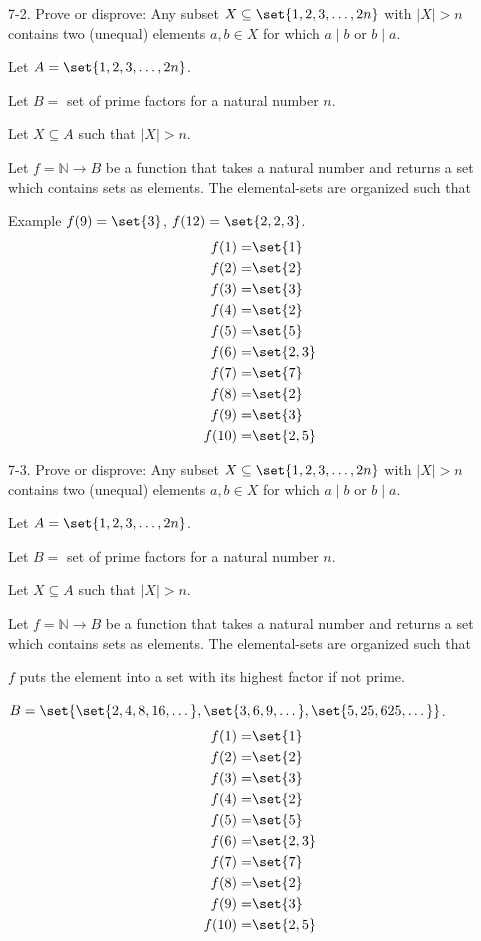 \documentclass{hippoidC}
\begin{document}
\begin{prooflist}{7-2. Prove or disprove: Any subset $X \subseteq\set{1,2,3, \ldots,
				2 n}$ with $|X|>n$ contains two (unequal) elements $a, b \in X$ for which
		$a \mid b$ or $b \mid a$.}
	\item Let $A=\set{1,2,3, \ldots, 2 n}$.
	\item Let $B=$ set of prime factors for a natural number $n$.
	\item Let $X\subseteq A$ such that $|X|>n$.
	\item Let $f=\mathbb{N} \rightarrow B $ be a function that takes a natural
	number and returns a set which contains sets as elements. The elemental-sets
	are organized such that
	\item Example $f(9) = \set{3}$, $f(12) = \set{2, 2, 3}$.
	\begin{align*}
		f(1) =  & \set{1}    \\
		f(2) =  & \set{2}    \\
		f(3) =  & \set{3}    \\
		f(4) =  & \set{2}    \\
		f(5) =  & \set{5}    \\
		f(6) =  & \set{2, 3} \\
		f(7) =  & \set{7}    \\
		f(8) =  & \set{2}    \\
		f(9) =  & \set{3}    \\
		f(10) = & \set{2, 5}
	\end{align*}
\end{prooflist}

\begin{prooflist}{7-3. Prove or disprove: Any subset $X \subseteq\set{1,2,3, \ldots,
				2 n}$ with $|X|>n$ contains two (unequal) elements $a, b \in X$ for which
		$a \mid b$ or $b \mid a$.}
	\item Let $A=\set{1,2,3, \ldots, 2 n}$.
	\item Let $B=$ set of prime factors for a natural number $n$.
	\item Let $X\subseteq A$ such that $|X|>n$.
	\item Let $f=\mathbb{N} \rightarrow B $ be a function that takes a natural
	number and returns a set which contains sets as elements. The elemental-sets
	are organized such that
	\item $f$ puts the element into a set with its highest factor if not prime.
	\item $B=\set{\set{2, 4, 8, 16,\dots}, \set{3, 6, 9, \dots}, \set{5, 25, 625,
				\dots}}$.
	\begin{align*}
		f(1) =  & \set{1}    \\
		f(2) =  & \set{2}    \\
		f(3) =  & \set{3}    \\
		f(4) =  & \set{2}    \\
		f(5) =  & \set{5}    \\
		f(6) =  & \set{2, 3} \\
		f(7) =  & \set{7}    \\
		f(8) =  & \set{2}    \\
		f(9) =  & \set{3}    \\
		f(10) = & \set{2, 5}
	\end{align*}
\end{prooflist}
\end{document}
